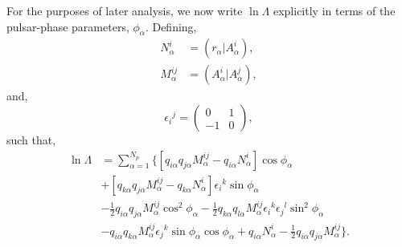 \documentclass[twocolappendix,tighten]{emulateapj}
\begin{document}
For the purposes of later analysis, we now write $\ln\Lambda$ explicitly in terms of the pulsar-phase parameters, $\phi_{\alpha}$. Defining,
\begin{align}
N^i_{\alpha} &= (r_{\alpha}|A^i_{\alpha}),\nonumber\\
M^{ij}_{\alpha} &= (A^i_{\alpha}|A^j_{\alpha}),
\end{align}
and,
\begin{equation}
\epsilon_i{}^j = \begin{pmatrix}0 & 1\\-1 & 0\end{pmatrix},
\end{equation}
such that,
\begin{align}
\ln\Lambda& = \sum_{\alpha=1}^{N_p} \Big\{\left[q_{i\alpha}q_{j\alpha}M_{\alpha}^{ij} - q_{i\alpha}N_{\alpha}^i\right]\cos\phi_{\alpha} \nonumber\\
&+ \left[q_{k\alpha}q_{j\alpha}M_{\alpha}^{ij} - q_{k\alpha}N_{\alpha}^i\right]\epsilon_i{}^k\sin\phi_{\alpha} \nonumber\\
&- \frac{1}{2}q_{i\alpha}q_{j\alpha}M_{\alpha}^{ij}\cos^2\phi_{\alpha} - \frac{1}{2}q_{k\alpha}q_{l\alpha}M_{\alpha}^{ij}\epsilon_i{}^k\epsilon_j{}^l\sin^2\phi_{\alpha} \nonumber\\
&- q_{i\alpha}q_{k\alpha}M_{\alpha}^{ij}\epsilon_j{}^k\sin\phi_{\alpha}\cos\phi_{\alpha} + q_{i\alpha}N_{\alpha}^i - \frac{1}{2}q_{i\alpha}q_{j\alpha}M_{\alpha}^{ij}\Big\}.
\end{align}
\end{document}
